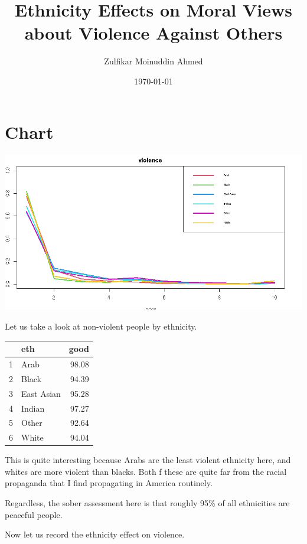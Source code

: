 \documentclass{amsart}
\title{Ethnicity Effects on Moral Views about Violence Against Others}
\author{Zulfikar Moinuddin Ahmed}
\date{\today}
\begin{document}
\maketitle

\section{Chart}

\includegraphics[scale=0.5]{ethviol.jpeg}

Let us take a look at non-violent people by ethnicity.

\begin{table}[ht]
\centering
\begin{tabular}{rlr}
  \hline
 & eth & good \\ 
  \hline
1 & Arab & 98.08 \\ 
  2 & Black & 94.39 \\ 
  3 & East Asian & 95.28 \\ 
  4 & Indian & 97.27 \\ 
  5 & Other & 92.64 \\ 
  6 & White & 94.04 \\ 
   \hline
\end{tabular}
\end{table}

This is quite interesting because Arabs are the least violent ethnicity here, and whites are more violent than blacks.  Both f these are quite far from the racial propaganda that I find propagating in America routinely.

Regardless, the sober assessment here is that roughly 95\% of all ethnicities are peaceful people.

Now let us record the ethnicity effect on violence.
\end{document}
